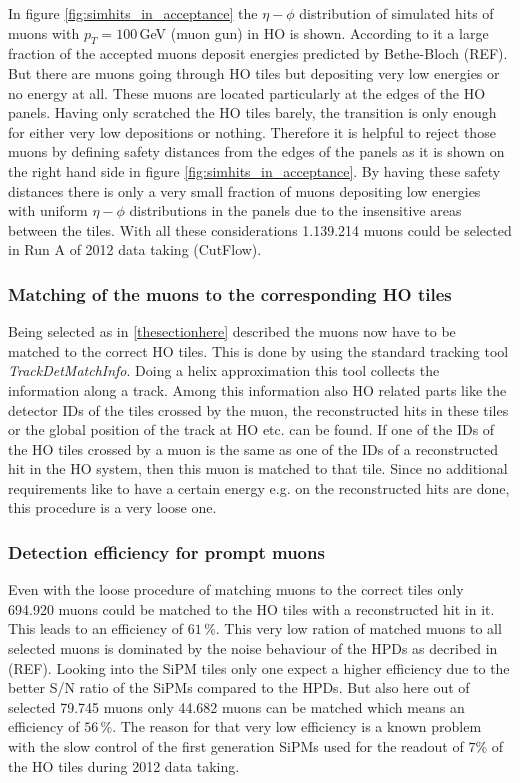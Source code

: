 			In figure \ref{fig:simhits_in_acceptance} the $\eta-\phi$ distribution of simulated hits of muons with $p_T = 100$\,GeV (muon gun) in HO is shown.
			According to it a large fraction of the accepted muons deposit energies predicted by Bethe-Bloch (REF).
			But there are muons going through HO tiles but depositing very low energies or no energy at all.
			These muons are located particularly at the edges of the HO panels.
			Having only scratched the HO tiles barely, the transition is only enough for either very low depositions or nothing.
			Therefore it is helpful to reject those muons by defining safety distances from the edges of the panels as it is shown on the right hand side in figure
			\ref{fig:simhits_in_acceptance}.
			By having these safety distances there is only a very small fraction of muons depositing low energies with uniform $\eta-\phi$ distributions in the panels due to the insensitive areas between
			the tiles.
			With all these considerations 1.139.214 muons could be selected in Run A of 2012 data taking (CutFlow).
		\subsubsection{Matching of the muons to the corresponding HO tiles}
			Being selected as in \ref{thesectionhere} described the muons now have to be matched to the correct HO tiles.
			This is done by using the standard tracking tool \textit{TrackDetMatchInfo}.
			Doing a helix approximation this tool collects the information along a track.
			Among this information also HO related parts like the detector IDs of the tiles crossed by the muon, the reconstructed hits in these tiles or the global position of the track at HO etc. can be
			found.
			If one of the IDs of the HO tiles crossed by a muon is the same as one of the IDs of a reconstructed hit in the HO system, then this muon is matched to that tile.
			Since no additional requirements like to have a certain energy e.g. on the reconstructed hits are done, this procedure is a very loose one.
		\subsubsection{Detection efficiency for prompt muons}
			Even with the loose procedure of matching muons to the correct tiles only 694.920 muons could be matched to the HO tiles with a reconstructed hit in it. This leads to an efficiency of $61\,\%$.
			This very low ration of matched muons to all selected muons is dominated by the noise behaviour of the HPDs as decribed in (REF).
			Looking into the SiPM tiles only one expect a higher efficiency due to the better S/N ratio of the SiPMs compared to the HPDs.
			But also here out of selected 79.745 muons only 44.682 muons can be matched which means an efficiency of $56\,\%$.
			The reason for that very low efficiency is a known problem with the slow control of the first generation SiPMs used for the readout of $7\%$ of the HO tiles during 2012 data taking.    
